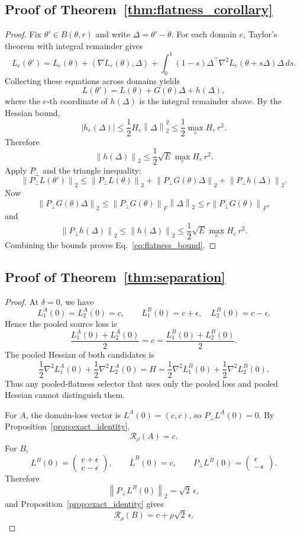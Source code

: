 \documentclass{article}
\theoremstyle{definition}
\newcommand{\norm}[1]{\left\lVert #1 \right\rVert}
\newcommand{\abs}[1]{\left\lvert #1 \right\rvert}
\newcommand{\inner}[2]{\left\langle #1, #2 \right\rangle}
\begin{document}
\subsection{Proof of Theorem~\ref{thm:flatness_corollary}}

\begin{proof}
Fix \(\theta' \in B(\theta,r)\) and write \(\Delta=\theta'-\theta\). For each domain \(e\), Taylor's theorem with integral remainder gives
\[
L_e(\theta')
=
L_e(\theta)
+ \inner{\nabla L_e(\theta)}{\Delta}
+ \int_{0}^{1}(1-s)\Delta^\top \nabla^2 L_e(\theta+s\Delta)\Delta \, ds.
\]
Collecting these equations across domains yields
\[
L(\theta')
=
L(\theta) + G(\theta)\Delta + h(\Delta),
\]
where the \(e\)-th coordinate of \(h(\Delta)\) is the integral remainder above. By the Hessian bound,
\[
\abs{h_e(\Delta)}
\le
\frac{1}{2}H_e \norm{\Delta}_2^2
\le
\frac{1}{2}\max_e H_e \, r^2.
\]
Therefore
\[
\norm{h(\Delta)}_2
\le
\frac{1}{2}\sqrt{E}\max_e H_e \, r^2.
\]
Apply \(P_\perp\) and the triangle inequality:
\[
\norm{P_\perp L(\theta')}_2
\le
\norm{P_\perp L(\theta)}_2
+ \norm{P_\perp G(\theta)\Delta}_2
+ \norm{P_\perp h(\Delta)}_2.
\]
Now
\[
\norm{P_\perp G(\theta)\Delta}_2
\le
\norm{P_\perp G(\theta)}_F \norm{\Delta}_2
\le
r \norm{P_\perp G(\theta)}_F,
\]
and
\[
\norm{P_\perp h(\Delta)}_2 \le \norm{h(\Delta)}_2
\le
\frac{1}{2}\sqrt{E}\max_e H_e \, r^2.
\]
Combining the bounds proves Eq.~\eqref{eq:flatness_bound}.
\end{proof}

\subsection{Proof of Theorem~\ref{thm:separation}}

\begin{proof}
At \(\delta=0\), we have
\[
L_1^A(0)=L_2^A(0)=c,
\qquad
L_1^B(0)=c+\epsilon,
\quad
L_2^B(0)=c-\epsilon.
\]
Hence the pooled source loss is
\[
\frac{L_1^A(0)+L_2^A(0)}{2}=c
=
\frac{L_1^B(0)+L_2^B(0)}{2}.
\]
The pooled Hessian of both candidates is
\[
\frac{1}{2}\nabla^2 L_1^A(0)+\frac{1}{2}\nabla^2 L_2^A(0)
=
H
=
\frac{1}{2}\nabla^2 L_1^B(0)+\frac{1}{2}\nabla^2 L_2^B(0).
\]
Thus any pooled-flatness selector that uses only the pooled loss and pooled Hessian cannot distinguish them.

For \(A\), the domain-loss vector is \(L^A(0)=(c,c)\), so \(P_\perp L^A(0)=0\). By Proposition~\ref{prop:exact_identity},
\[
\mathcal R_\rho(A)=c.
\]
For \(B\),
\[
L^B(0)=\begin{pmatrix} c+\epsilon \\ c-\epsilon \end{pmatrix},
\qquad
\bar L^B(0)=c,
\qquad
P_\perp L^B(0)=\begin{pmatrix} \epsilon \\ -\epsilon \end{pmatrix}.
\]
Therefore
\[
\norm{P_\perp L^B(0)}_2=\sqrt{2}\,\epsilon,
\]
and Proposition~\ref{prop:exact_identity} gives
\[
\mathcal R_\rho(B)=c+\rho\sqrt{2}\,\epsilon.
\]
\end{proof}
\end{document}
